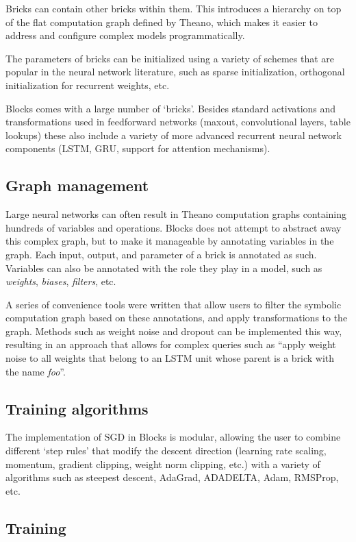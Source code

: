 \documentclass[twoside,11pt]{article}
\begin{document}
Bricks can contain other bricks within them. This introduces a hierarchy on top
of the flat computation graph defined by Theano, which makes it easier to
address and configure complex models programmatically.

The parameters of bricks can be initialized using a variety of schemes that are
popular in the neural network literature, such as sparse initialization,
orthogonal initialization for recurrent weights, etc.

Blocks comes with a large number of `bricks'. Besides standard activations and
transformations used in feedforward networks (maxout, convolutional layers,
table lookups) these also include a variety of more advanced recurrent neural
network components (LSTM, GRU, support for attention mechanisms).

\subsection{Graph management}

Large neural networks can often result in Theano computation graphs containing
hundreds of variables and operations. Blocks does not attempt to abstract away
this complex graph, but to make it manageable by annotating variables in the
graph. Each input, output, and parameter of a brick is annotated as such.
Variables can also be annotated with the role they play in a model, such as
\emph{weights}, \emph{biases}, \emph{filters}, etc.

A series of convenience tools were written that allow users to filter the
symbolic computation graph based on these annotations, and apply transformations
to the graph. Methods such as weight noise and dropout can be implemented this
way, resulting in an approach that allows for complex queries such as ``apply
weight noise to all weights that belong to an LSTM unit whose parent is a brick
with the name \emph{foo}''.

\subsection{Training algorithms}

The implementation of SGD in Blocks is modular, allowing the user to combine
different `step rules' that modify the descent direction (learning rate scaling,
momentum, gradient clipping, weight norm clipping, etc.) with a variety of
algorithms such as steepest descent, AdaGrad, ADADELTA, Adam, RMSProp, etc.

\subsection{Training}
\end{document}
